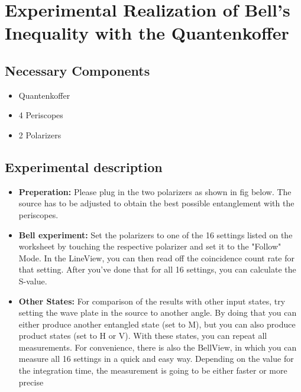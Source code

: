 \chapter{Experimental Realization of Bell's Inequality with the Quantenkoffer}
\label{appendexA:Bell_exp_quCASE}

\section{Necessary Components}

\begin{itemize}
	\item Quantenkoffer
	\item 4 Periscopes
	\item 2 Polarizers
\end{itemize}

\section{Experimental description}

\begin{itemize}
	\item \textbf{Preperation: }
	Please plug in the two polarizers as shown in fig below. The source has to be adjusted to obtain the best possible entanglement with the periscopes.
	\item \textbf{Bell experiment: }
	Set the polarizers to one of the 16 settings listed on the worksheet by touching the respective polarizer and set it to the "Follow" Mode. In the LineView, you can then read off the coincidence count rate for that setting. After you've done that for all 16 settings, you can calculate the S-value.
	\item \textbf{Other States: }
	For comparison of the results with other input states, try setting the wave plate in the source to another angle. By doing that you can either produce another entangled state (set to M), but you can also produce product states (set to H or V). With these states, you can repeat all measurements. For convenience, there is also the BellView, in which you can measure all 16 settings in a quick and easy way. Depending on the value for the integration time, the measurement is going to be either faster or more precise
\end{itemize}

